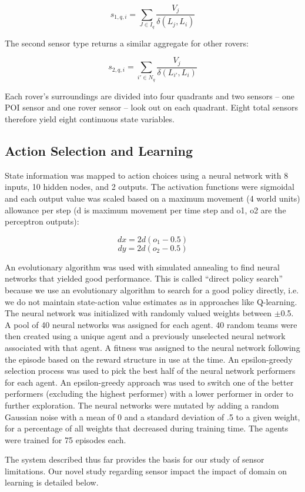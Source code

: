 \documentclass[letterpaper, 10 pt, conference]{ieeeconf}  %
\begin{document}
\[
s_{1,q,i} =  \sum_{J \in I_q}  \frac{V_j}{\delta (L_j, L_i)} 
\]

The second sensor type returns a similar aggregate for other rovers:

\[
s_{2,q,i} =  \sum_{i' \in N_q}  \frac{V_j}{\delta (L_{i'}, L_i)}  
\]

Each rover’s surroundings are divided into four quadrants and two
sensors -- one POI sensor and one rover sensor -- look out on each
quadrant. Eight total sensors therefore yield eight continuous state
variables.

\subsection{Action Selection and Learning}
State information was mapped to action choices using a neural network with
8 inputs, 10 hidden nodes, and 2 outputs. The activation functions
were sigmoidal and each output value was scaled based on a maximum
movement (4 world units) allowance per step (d is maximum movement per time step and
o1, o2 are the perceptron outputs):

\[
dx = 2d(o_1-0.5)
\]
\[
dy = 2d(o_2-0.5)
\]

An evolutionary algorithm was used with simulated annealing to find
neural networks that yielded good performance. This is called “direct
policy search” because we use an evolutionary algorithm to search for
a good policy directly, i.e. we do not maintain state-action value
estimates as in approaches like Q-learning. The neural network was initialized with randomly
valued weights between \(\pm\)0.5.  A pool of 40 neural networks was assigned for each agent.  40 random
teams were then created using a unique agent and a previously unselected neural network associated with that agent.
A fitness was assigned to the neural network following the episode based on the reward structure in use at 
the time.  An epsilon-greedy selection process was used to pick the best half of the neural network performers for each agent.  An 
epsilon-greedy approach was used to switch one of the better performers (excluding the highest performer) with a lower performer in 
order to further exploration.  The neural networks were mutated by adding a random Gaussian noise with a mean of 0 and a standard deviation of .5 to a given weight, for a percentage of all weights that decreased during training time.
The agents were trained for 75 episodes each.

The system described thus far provides the basis for our study of sensor limitations. Our novel
study regarding sensor impact the impact of domain on learning is detailed below.
\end{document}
